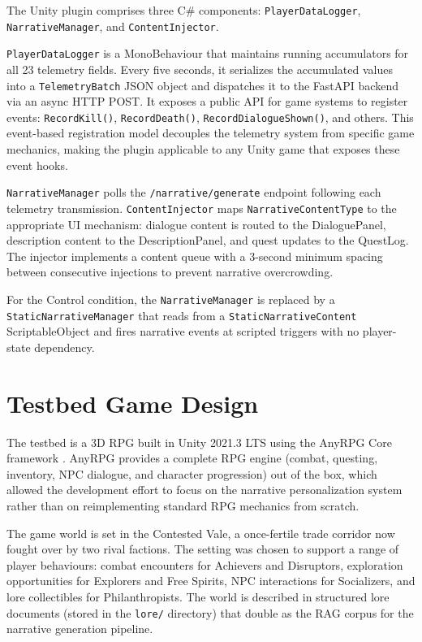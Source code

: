 The Unity plugin comprises three C\# components: \texttt{PlayerDataLogger}, \texttt{NarrativeManager}, and \texttt{ContentInjector}.

\texttt{PlayerDataLogger} is a MonoBehaviour that maintains running accumulators for all 23 telemetry fields. Every five seconds, it serializes the accumulated values into a \texttt{TelemetryBatch} JSON object and dispatches it to the FastAPI backend via an async HTTP POST. It exposes a public API for game systems to register events: \texttt{RecordKill()}, \texttt{RecordDeath()}, \texttt{RecordDialogueShown()}, and others. This event-based registration model decouples the telemetry system from specific game mechanics, making the plugin applicable to any Unity game that exposes these event hooks.

\texttt{NarrativeManager} polls the \texttt{/narrative/generate} endpoint following each telemetry transmission. \texttt{ContentInjector} maps \texttt{NarrativeContentType} to the appropriate UI mechanism: dialogue content is routed to the DialoguePanel, description content to the DescriptionPanel, and quest updates to the QuestLog. The injector implements a content queue with a 3-second minimum spacing between consecutive injections to prevent narrative overcrowding.

For the Control condition, the \texttt{NarrativeManager} is replaced by a \texttt{StaticNarrativeManager} that reads from a \texttt{StaticNarrativeContent} ScriptableObject and fires narrative events at scripted triggers with no player-state dependency.

\section{Testbed Game Design}

The testbed is a 3D RPG built in Unity 2021.3 LTS using the AnyRPG Core framework \citep{anyrpg2024core}. AnyRPG provides a complete RPG engine (combat, questing, inventory, NPC dialogue, and character progression) out of the box, which allowed the development effort to focus on the narrative personalization system rather than on reimplementing standard RPG mechanics from scratch.

The game world is set in the Contested Vale, a once-fertile trade corridor now fought over by two rival factions. The setting was chosen to support a range of player behaviours: combat encounters for Achievers and Disruptors, exploration opportunities for Explorers and Free Spirits, NPC interactions for Socializers, and lore collectibles for Philanthropists. The world is described in structured lore documents (stored in the \texttt{lore/} directory) that double as the RAG corpus for the narrative generation pipeline.

